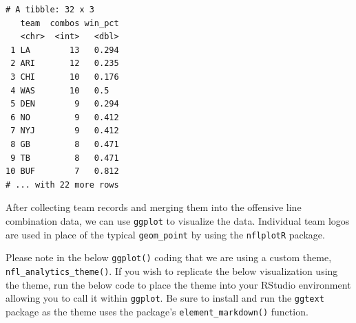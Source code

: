 \documentclass[
  letterpaper,
]{krantz}
\begin{document}
\begin{verbatim}
# A tibble: 32 x 3
   team  combos win_pct
   <chr>  <int>   <dbl>
 1 LA        13   0.294
 2 ARI       12   0.235
 3 CHI       10   0.176
 4 WAS       10   0.5  
 5 DEN        9   0.294
 6 NO         9   0.412
 7 NYJ        9   0.412
 8 GB         8   0.471
 9 TB         8   0.471
10 BUF        7   0.812
# ... with 22 more rows
\end{verbatim}

After collecting team records and merging them into the offensive line
combination data, we can use \texttt{ggplot} to visualize the data.
Individual team logos are used in place of the typical
\texttt{geom\_point} by using the \texttt{nflplotR} package.

\begin{tcolorbox}[enhanced jigsaw, colback=white, leftrule=.75mm, breakable, colframe=quarto-callout-important-color-frame, bottomtitle=1mm, rightrule=.15mm, left=2mm, opacityback=0, bottomrule=.15mm, arc=.35mm, coltitle=black, colbacktitle=quarto-callout-important-color!10!white, toptitle=1mm, titlerule=0mm, title=\textcolor{quarto-callout-important-color}{\faExclamation}\hspace{0.5em}{Important}, toprule=.15mm, opacitybacktitle=0.6]

Please note in the below \texttt{ggplot()} coding that we are using a
custom theme, \texttt{nfl\_analytics\_theme()}. If you wish to replicate
the below visualization using the theme, run the below code to place the
theme into your RStudio environment allowing you to call it within
\texttt{ggplot}. Be sure to install and run the \texttt{ggtext} package
as the theme uses the package's \texttt{element\_markdown()} function.

\end{tcolorbox}
\end{document}
